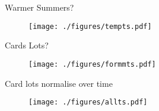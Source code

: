 \documentclass[presentation, smaller]{beamer}
\begin{document}
\begin{frame}[label={sec:orgheadline23}]{Warmer Summers?}
\begin{figure}[htb]
\centering
\texttt{[image: ./figures/tempts.pdf]}
\label{fig:temp}
\end{figure}
\end{frame}

\begin{frame}[label={sec:orgheadline24}]{Cards Lots?}
\begin{figure}[htb]
\centering
\texttt{[image: ./figures/formmts.pdf]}
\label{fig:cards}
\end{figure}
\end{frame}


\begin{frame}[label={sec:orgheadline25}]{Card lots normalise over time}
\begin{figure}[htb]
\centering
\texttt{[image: ./figures/allts.pdf]}
\label{fig:all}
\end{figure}
\end{frame}
\end{document}
